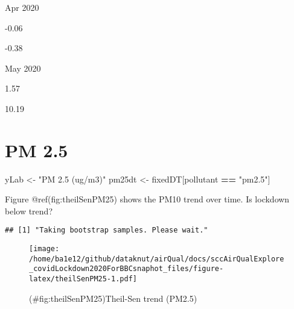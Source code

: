 \documentclass[]{article}
\newenvironment{Shaded}{\begin{snugshade}}{\end{snugshade}}
\newcommand{\KeywordTok}[1]{\textcolor[rgb]{0.13,0.29,0.53}{\textbf{#1}}}
\newcommand{\DataTypeTok}[1]{\textcolor[rgb]{0.13,0.29,0.53}{#1}}
\newcommand{\DecValTok}[1]{\textcolor[rgb]{0.00,0.00,0.81}{#1}}
\newcommand{\StringTok}[1]{\textcolor[rgb]{0.31,0.60,0.02}{#1}}
\newcommand{\CommentTok}[1]{\textcolor[rgb]{0.56,0.35,0.01}{\textit{#1}}}
\newcommand{\OtherTok}[1]{\textcolor[rgb]{0.56,0.35,0.01}{#1}}
\newcommand{\OperatorTok}[1]{\textcolor[rgb]{0.81,0.36,0.00}{\textbf{#1}}}
\newcommand{\NormalTok}[1]{#1}
\begin{document}
Apr 2020

-0.06

-0.38

May 2020

1.57

10.19

\section{PM 2.5}\label{pm-2.5}

\begin{Shaded}
\begin{Highlighting}[]
\NormalTok{yLab <-}\StringTok{ "PM 2.5 (ug/m3)"}
\NormalTok{pm25dt <-}\StringTok{ }\NormalTok{fixedDT[pollutant }\OperatorTok{==}\StringTok{ "pm2.5"}\NormalTok{]}
\end{Highlighting}
\end{Shaded}

Figure @ref(fig:theilSenPM25) shows the PM10 trend over time. Is
lockdown below trend?

\begin{Shaded}
\end{Shaded}

\begin{verbatim}
## [1] "Taking bootstrap samples. Please wait."
\end{verbatim}

\begin{figure}
\centering
\texttt{[image: /home/ba1e12/github/dataknut/airQual/docs/sccAirQualExplore\_covidLockdown2020ForBBCsnaphot\_files/figure-latex/theilSenPM25-1.pdf]}
\caption{(\#fig:theilSenPM25)Theil-Sen trend (PM2.5)}
\end{figure}
\end{document}
